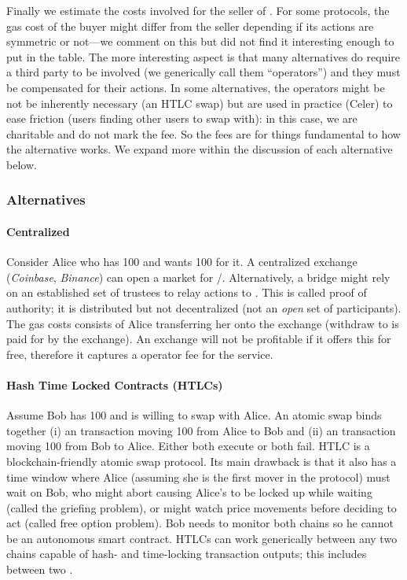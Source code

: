 Finally we estimate the costs involved for the seller of \ethtwo. For some protocols, the gas cost of the buyer might differ from the seller depending if its actions are symmetric or not---we comment on this but did not find it interesting enough to put in the table. The more interesting aspect is that many alternatives do require a third party to be involved (we generically call them ``operators'') and they must be compensated for their actions. In some alternatives, the operators might be not be inherently necessary (\eg an HTLC swap) but are used in practice (\eg Celer) to ease friction (\eg users finding other users to swap with): in this case, we are charitable and do not mark the fee. So the fees are for things fundamental to how the alternative works. We expand more within the discussion of each alternative below. 

\subsubsection{Alternatives} 


\paragraph*{Centralized} Consider Alice who has 100 \ethtwo and wants 100 \ethone for it. A centralized exchange (\eg \textit{Coinbase}, \textit{Binance}) can open a market for \ethtwo/\ethone. Alternatively, a bridge might rely on an established set of trustees to relay \layertwo actions to \layerone. This is called proof of authority; it is distributed but not decentralized (\ie not an \textit{open} set of participants). The gas costs consists of Alice transferring her \ethtwo onto the exchange (withdraw to \layerone is paid for by the exchange). An exchange will not be profitable if it offers this for free, therefore it captures a operator fee for the service. 

\paragraph*{Hash Time Locked Contracts (HTLCs)} Assume Bob has 100 \ethone and is willing to swap with Alice. An atomic swap binds together (i) an \layertwo transaction moving 100 \ethtwo from Alice to Bob and (ii) an \layerone transaction moving 100 \ethone from Bob to Alice. Either both execute or both fail. HTLC is a blockchain-friendly atomic swap protocol. Its main drawback is that it also has a time window where Alice (assuming she is the first mover in the protocol) must wait on Bob, who might abort causing Alice's \ethtwo to be locked up while waiting (called the griefing problem), or might watch price movements before deciding to act (called free option problem). Bob needs to monitor both chains so he cannot be an autonomous smart contract. HTLCs can work generically between any two chains capable of hash- and time-locking transaction outputs; this includes between two \layertwos. 

